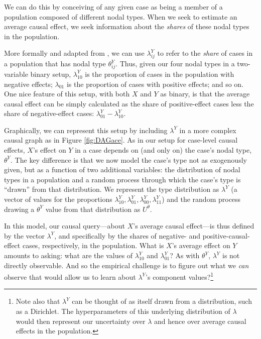 \documentclass[
  12pt,
]{book}
\begin{document}
We can do this by conceiving of any given case as being a member of a population composed of different nodal types. When we seek to estimate an average causal effect, we seek information about the \emph{shares} of these nodal types in the population.

More formally and adapted from \citet{humphreys2015mixing}, we can use \(\lambda^Y_{ij}\) to refer to the \emph{share} of cases in a population that has nodal type \(\theta^Y_{ij}\). Thus, given our four nodal types in a two-variable binary setup, \(\lambda^Y_{10}\) is the proportion of cases in the population with negative effects; \(\lambda_{01}\) is the proportion of cases with positive effects; and so on. One nice feature of this setup, with both \(X\) and \(Y\) as binary, is that the average causal effect can be simply calculated as the share of positive-effect cases less the share of negative-effect cases: \(\lambda^Y_{01} - \lambda^Y_{10}\).

Graphically, we can represent this setup by including \(\lambda^Y\) in a more complex causal graph as in Figure \ref{fig:DAGace}. As in our setup for case-level causal effects, \(X\)'s effect on \(Y\) in a case depends on (and only on) the case's nodal type, \(\theta^Y\). The key difference is that we now model the case's type not as exogenously given, but as a function of two additional variables: the distribution of nodal types in a population and a random process through which the case's type is ``drawn'' from that distribution. We represent the type distribution as \(\lambda^Y\) (a vector of values for the proportions \(\lambda^Y_{10}, \lambda^Y_{01}, \lambda^Y_{00}, \lambda^Y_{11}\)) and the random process drawing a \(\theta^Y\) value from that distribution as \(U^\theta\).

In this model, our causal query---about \(X\)'s average causal effect---is thus defined by the vector \(\lambda^Y\), and specifically by the shares of negative- and positive-causal-effect cases, respectively, in the population. What is \(X\)'s average effect on \(Y\) amounts to asking: what are the values of \(\lambda^Y_{10}\) and \(\lambda^Y_{01}\)? As with \(\theta^Y\), \(\lambda^Y\) is not directly observable. And so the empirical challenge is to figure out what we \emph{can} observe that would allow us to learn about \(\lambda^Y\)'s component values?\footnote{Note also that \(\lambda^Y\) can be thought of as itself drawn from a distribution, such as a Dirichlet. The hyperparameters of this underlying distribution of \(\lambda\) would then represent our uncertainty over \(\lambda\) and hence over average causal effects in the population.}
\end{document}
